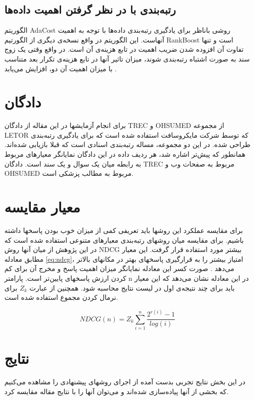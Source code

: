 \documentclass{article}
\begin{document}
\subsection{رتبه‌بندی با در نظر گرفتن اهمیت داده‌ها}
الگوریتم AdaCost روشی باناظر برای یادگیری رتبه‌بندی داده‌ها با توجه به اهمیت آنهاست. این الگوریتم در واقع نسخه‌ی دیگری از الگورتیم RankBoost است و تنها تفاوت آن افزوده شدن ضریب اهمیت در تابع هزینه‌ی آن است. در واقع وقتی یک زوج سند به صورت اشتباه رتبه‌بندی شوند، میزان تاثیر آنها در تابع هزینه‌ی تکرار بعد متناسب با میزان اهمیت آن دو، افزایش می‌یابد \cite{adacost}.

\section{دادگان}
برای انجام آزمایشها در این مقاله از دادگان TREC و OHSUMED از مجموعه LETOR که توسط شرکت مایکروسافت استفاده شده است که برای یادگیری رتبه‌بندی طراحی شده. در این دو مجموعه، مساله رتبه‌بندی اسنادی است که قبلا بازیابی شده‌اند. همانطور که پیش‌تر اشاره شد، هر ردیف داده در این دادگان نمایانگر معیارهای مربوط به رابطه میان یک سوال و یک سند است. دادگان TREC مربوط به صفحات وب و OHSUMED مربوط به مطالب پزشکی است.

 \section{معیار مقایسه}
برای مقایسه عملکرد این روشها باید تعریفی کمی از میزان خوب بودن پاسخها داشته باشیم. برای مقایسه میان روشهای رتبه‌بندی معیارهای متنوعی استفاده شده است که در این پژوهش از میان آنها روش NDCG بیشتر مورد استفاده قرار گرفت. این معیار مطابق معادله \ref{eq:ndcg}، امتیاز بیشتر را به قرارگیری پاسخهای بهتر در مکانهای بالاتر می‌دهد \cite{ndcg}. صورت کسر این معادله نمایانگر میزان اهمیت پاسخ و مخرج آن برای کم کردن ارزش پاسخهای پایین‌تر است. پارامتر n در این معادله نشان می‌دهد که این معیار باید برای چند نتیجه‌ی اول در لیست نتایج محاسبه شود. همچنین از عبارت $Z_k$ برای نرمال کردن مجموع استفاده شده است.

\begin{equation} \label{eq:ndcg}
NDCG(n)=Z_k \sum _{i=1}^{n}{\frac {2^{r(i)}-1}{log(i)}} 
\end{equation}
 
 \section{نتایج}
در این بخش نتایج تجربی بدست آمده از اجرای روشهای پیشنهادی را مشاهده می‌کنیم که بخشی از آنها پیاده‌سازی شده‌اند و می‌توان آنها را با نتایج مقاله مقایسه کرد.
  
\end{document}
